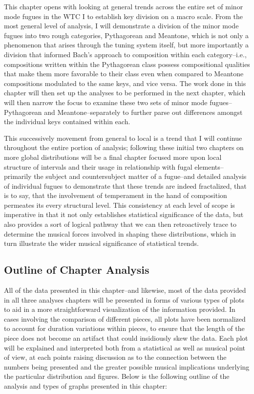This chapter opens with looking at general trends across the entire set
of minor mode fugues in the WTC I to establish key division on a macro
scale. From the most general level of analysis, I will demonstrate a
division of the minor mode fugues into two rough categories, Pythagorean
and Meantone, which is not only a phenomenon that arises through the
tuning system itself, but more importantly a division that informed
Bach's approach to composition within each category--i.e.,
compositions written within the Pythagorean class possess compositional
qualities that make them more favorable to their class even when
compared to Meantone compositions modulated to the same keys, and vice
versa. The work done in this chapter will then set up the analyses to be
performed in the next chapter, which will then narrow the focus to
examine these two sets of minor mode fugues--Pythagorean and
Meantone--separately to further parse out differences amongst the
individual keys contained within each.

This successively movement from general to local is a trend that I will
continue throughout the entire portion of analysis; following these
initial two chapters on more global distributions will be a final
chapter focused more upon local structure of intervals and their usage
in relationship with fugal elements--primarily the subject and
countersubject matter of a fugue--and detailed analysis of individual
fugues to demonstrate that these trends are indeed fractalized, that is
to say, that the involvement of temperament in the hand of composition
permeates its every structural level. This consistency at each level of
scope is imperative in that it not only establishes statistical
significance of the data, but also provides a sort of logical pathway
that we can then retroactively trace to determine the musical forces
involved in shaping these distributions, which in turn illustrate the
wider musical significance of statistical trends.

\subsection{Outline of Chapter
Analysis}\label{outline-of-chapter-analysis}

All of the data presented in this chapter--and likewise, most of the
data provided in all three analyses chapters will be presented in forms
of various types of plots to aid in a more straightforward visualization
of the information provided. In cases involving the comparison of
different pieces, all plots have been normalized to account for duration
variations within pieces, to ensure that the length of the piece does
not become an artifact that could insidiously skew the data. Each plot
will be explained and interpreted both from a statistical as well as
musical point of view, at each points raising discussion as to the
connection between the numbers being presented and the greater possible
musical implications underlying the particular distribution and figures.
Below is the following outline of the analysis and types of graphs
presented in this chapter:

